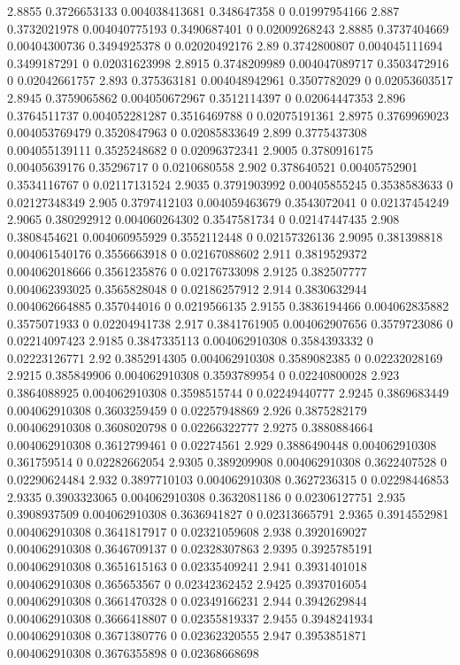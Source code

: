 {2.8855 0.3726653133 0.004038413681 0.348647358 0 0.01997954166
2.887 0.3732021978 0.004040775193 0.3490687401 0 0.02009268243
2.8885 0.3737404669 0.00404300736 0.3494925378 0 0.02020492176
2.89 0.3742800807 0.004045111694 0.3499187291 0 0.02031623998
2.8915 0.3748209989 0.004047089717 0.3503472916 0 0.02042661757
2.893 0.375363181 0.004048942961 0.3507782029 0 0.02053603517
2.8945 0.3759065862 0.004050672967 0.3512114397 0 0.02064447353
2.896 0.3764511737 0.004052281287 0.3516469788 0 0.02075191361
2.8975 0.3769969023 0.004053769479 0.3520847963 0 0.02085833649
2.899 0.3775437308 0.004055139111 0.3525248682 0 0.02096372341
2.9005 0.3780916175 0.00405639176 0.35296717 0 0.0210680558
2.902 0.378640521 0.00405752901 0.3534116767 0 0.02117131524
2.9035 0.3791903992 0.00405855245 0.3538583633 0 0.02127348349
2.905 0.3797412103 0.004059463679 0.3543072041 0 0.02137454249
2.9065 0.380292912 0.004060264302 0.3547581734 0 0.02147447435
2.908 0.3808454621 0.004060955929 0.3552112448 0 0.02157326136
2.9095 0.381398818 0.004061540176 0.3556663918 0 0.02167088602
2.911 0.3819529372 0.004062018666 0.3561235876 0 0.02176733098
2.9125 0.382507777 0.004062393025 0.3565828048 0 0.02186257912
2.914 0.3830632944 0.004062664885 0.357044016 0 0.0219566135
2.9155 0.3836194466 0.004062835882 0.3575071933 0 0.02204941738
2.917 0.3841761905 0.004062907656 0.3579723086 0 0.02214097423
2.9185 0.3847335113 0.004062910308 0.3584393332 0 0.02223126771
2.92 0.3852914305 0.004062910308 0.3589082385 0 0.02232028169
2.9215 0.385849906 0.004062910308 0.3593789954 0 0.02240800028
2.923 0.3864088925 0.004062910308 0.3598515744 0 0.02249440777
2.9245 0.3869683449 0.004062910308 0.3603259459 0 0.02257948869
2.926 0.3875282179 0.004062910308 0.3608020798 0 0.02266322777
2.9275 0.3880884664 0.004062910308 0.3612799461 0 0.02274561
2.929 0.3886490448 0.004062910308 0.361759514 0 0.02282662054
2.9305 0.389209908 0.004062910308 0.3622407528 0 0.02290624484
2.932 0.3897710103 0.004062910308 0.3627236315 0 0.02298446853
2.9335 0.3903323065 0.004062910308 0.3632081186 0 0.02306127751
2.935 0.3908937509 0.004062910308 0.3636941827 0 0.02313665791
2.9365 0.3914552981 0.004062910308 0.3641817917 0 0.02321059608
2.938 0.3920169027 0.004062910308 0.3646709137 0 0.02328307863
2.9395 0.3925785191 0.004062910308 0.3651615163 0 0.02335409241
2.941 0.3931401018 0.004062910308 0.365653567 0 0.02342362452
2.9425 0.3937016054 0.004062910308 0.3661470328 0 0.02349166231
2.944 0.3942629844 0.004062910308 0.3666418807 0 0.02355819337
2.9455 0.3948241934 0.004062910308 0.3671380776 0 0.02362320555
2.947 0.3953851871 0.004062910308 0.3676355898 0 0.02368668698
}

